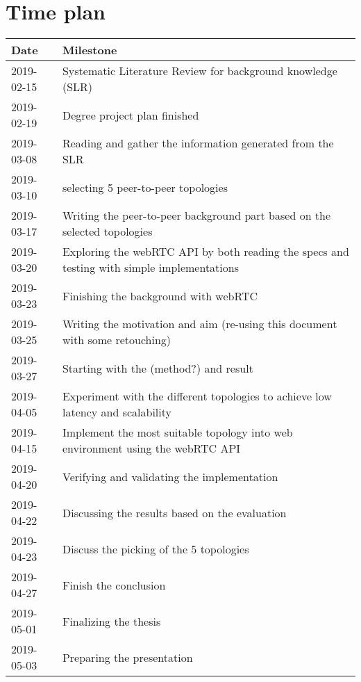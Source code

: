 \documentclass[12pt]{article}
\begin{document}
\section*{Time plan}
\begin{tabular} {|p{2.6cm}|p{10.2cm}|} \hline
\textbf{Date} & \textbf{Milestone} \\ \hline
2019-02-15 & Systematic Literature Review for background knowledge (SLR)\\ \hline
2019-02-19 & Degree project plan finished \\ \hline
2019-03-08 & Reading and gather the information generated from the SLR \\ \hline
2019-03-10 & selecting 5 peer-to-peer topologies \\ \hline
2019-03-17 & Writing the peer-to-peer background part based on the selected topologies \\ \hline
2019-03-20 & Exploring the webRTC API by both reading the specs and testing with simple implementations  \\ \hline
2019-03-23 & Finishing the background with webRTC \\ \hline
2019-03-25 & Writing the motivation and aim (re-using this document with some retouching) \\ \hline
2019-03-27 & Starting with the (method?) and result \\ \hline
2019-04-05 & Experiment with the different topologies to achieve low latency and scalability \\ \hline
2019-04-15 & Implement the most suitable topology into web environment using the webRTC API \\ \hline
2019-04-20 & Verifying and validating the implementation  \\ \hline
2019-04-22 & Discussing the results based on the evaluation  \\ \hline
2019-04-23 & Discuss the picking of the 5 topologies \\ \hline
2019-04-27 & Finish the conclusion \\ \hline
2019-05-01 & Finalizing the thesis  \\ \hline
2019-05-03 & Preparing the presentation \\ \hline
\end{tabular}

\pagebreak


\end{document}
